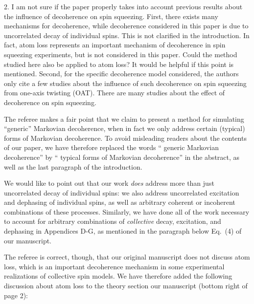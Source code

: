 \documentclass[preprint,superscriptaddress]{revtex4-2}
\newcommand{\1}{\mathds{1}}
\newcommand{\blue}[1]{{\color{blue} #1}}
\newcommand{\red}[1]{{\color{red} #1}}
\newcommand{\green}[1]{{\color{ForestGreen} #1}}
\begin{document}
\begin{enumerate}
  \blue{2. I am not sure if the paper properly takes into account
    previous results about the influence of decoherence on spin
    squeezing. First, there exists many mechanisms for decoherence,
    while decoherence considered in this paper is due to uncorrelated
    decay of individual spins. This is not clarified in the
    introduction. In fact, atom loss represents an important mechanism
    of decoherence in spin squeezing experiments, but is not
    considered in this paper. Could the method studied here also be
    applied to atom loss? It would be helpful if this point is
    mentioned. Second, for the specific decoherence model considered,
    the authors only cite a few studies about the influence of such
    decoherence on spin squeezing from one-axis twisting (OAT). There
    are many studies about the effect of decoherence on spin
    squeezing.}

  The referee makes a fair point that we claim to present a method for
  simulating ``generic'' Markovian decoherence, when in fact we only
  address certain (typical) forms of Markovian decoherence.  To avoid
  misleading readers about the contents of our paper, we have
  therefore replaced the words ``\red{generic Markovian decoherence}''
  by ``\green{typical forms of Markovian decoherence}'' in the
  abstract, as well as the last paragraph of the introduction.

  We would like to point out that our work {\it does} address more
  than just uncorrelated decay of individual spins: we also address
  uncorrelated excitation and dephasing of individual spins, as well
  as arbitrary coherent or incoherent combinations of these processes.
  Similarly, we have done all of the work necessary to account for
  arbitrary combinations of {\it collective} decay, excitation, and
  dephasing in Appendices D-G, as mentioned in the paragraph below
  Eq.~(4) of our manuscript.

  The referee is correct, though, that our original manuscript does
  not discuss atom loss, which is an important decoherence mechanism
  in some experimental realizations of collective spin models.  We
  have therefore added the following discussion about atom loss to the
  theory section our manuscript (bottom right of page 2):


\end{enumerate}
\end{document}
